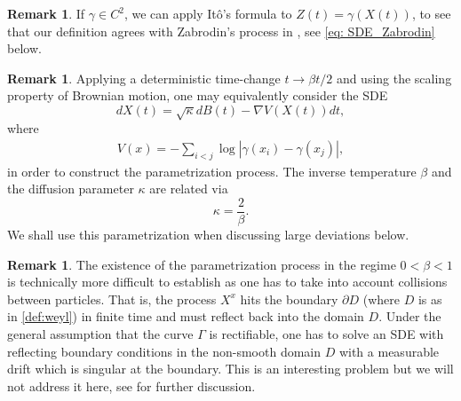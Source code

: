 \documentclass[11pt]{article}
\numberwithin{equation}{section}
\theoremstyle{definition}
\newtheorem{remark}[theorem]{Remark}
\begin{document}
\begin{remark}
   If $\gamma \in C^2$, we can apply It\^{o}'s formula to $Z(t) = \gamma(X(t))$, to see that our definition agrees with Zabrodin's process in \cite{zabrodin2023dyson}, see \eqref{eq: SDE_Zabrodin} below.
    \end{remark}
\begin{remark}\label{time-change-remark}
  Applying a deterministic time-change $t\to \beta t/2$ and using the scaling property of Brownian motion, one may equivalently consider the SDE
    \[
        dX(t) = \sqrt{\kappa}dB(t) - \nabla V(X(t))dt,
    \]
    where \begin{align}\label{def:V}
        V(x) = - \sum_{i<j}\log|\gamma(x_{i})-\gamma(x_{j})|,
    \end{align}
    in order to construct the parametrization process. The inverse temperature $\beta$ and the diffusion parameter $\kappa$ are related via
    \[
        \kappa = \frac{2}{\beta}.
    \]
    We shall use this parametrization when discussing large deviations below.
    \end{remark}
\begin{remark}
    The existence of the parametrization process in the regime $0<\beta<1$ is technically more difficult to establish as one has to take into account collisions between particles. That is, the process $X^{x}$ hits the boundary $\partial D$ (where $D$ is as in \eqref{def:weyl}) in finite time and must reflect back into the domain $D$. Under the general assumption that the curve $\Gamma$ is rectifiable, one has to solve an SDE with reflecting boundary conditions in the non-smooth domain $D$ with a measurable drift which is singular at the boundary. This is an interesting problem but we will not address it here, see  \cite{guskov2026thesis} for further discussion.
\end{remark}
\end{document}
